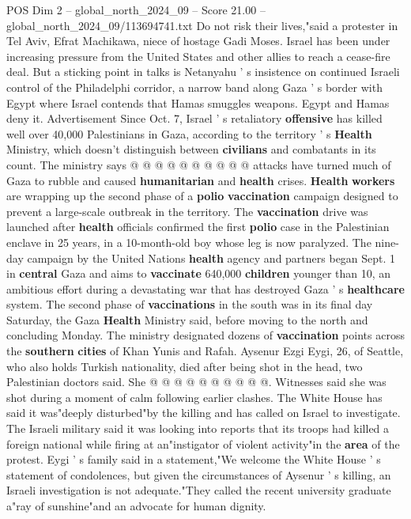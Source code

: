 \begin{textsample}{POS Dim 2 – global\_north\_2024\_09 – Score 21.00 – global\_north\_2024\_09/113694741.txt}
Do not risk their lives,"said a protester in Tel Aviv, Efrat Machikawa, niece of hostage Gadi Moses.
Israel has been under increasing pressure from the United States and other allies to reach a cease-fire deal.
But a sticking point in talks is Netanyahu ' s insistence on continued Israeli control of the Philadelphi corridor, a narrow band along Gaza ' s border with Egypt where Israel contends that Hamas smuggles weapons.
Egypt and Hamas deny it.
Advertisement Since Oct. 7, Israel ' s retaliatory \textbf{offensive} has killed well over 40,000 Palestinians in Gaza, according to the territory ' s \textbf{Health} Ministry, which doesn't distinguish between \textbf{civilians} and combatants in its count.
The ministry says @ @ @ @ @ @ @ @ @ @ attacks have turned much of Gaza to rubble and caused \textbf{humanitarian} and \textbf{health} crises. \textbf{Health} \textbf{workers} are wrapping up the second phase of a \textbf{polio} \textbf{vaccination} campaign designed to prevent a large-scale outbreak in the territory.
The \textbf{vaccination} drive was launched after \textbf{health} officials confirmed the first \textbf{polio} case in the Palestinian enclave in 25 years, in a 10-month-old boy whose leg is now paralyzed.
The nine-day campaign by the United Nations \textbf{health} agency and partners began Sept. 1 in \textbf{central} Gaza and aims to \textbf{vaccinate} 640,000 \textbf{children} younger than 10, an ambitious effort during a devastating war that has destroyed Gaza ' s \textbf{healthcare} system.
The second phase of \textbf{vaccinations} in the south was in its final day Saturday, the Gaza \textbf{Health} Ministry said, before moving to the north and concluding Monday.
The ministry designated dozens of \textbf{vaccination} points across the \textbf{southern} \textbf{cities} of Khan Yunis and Rafah.
Aysenur Ezgi Eygi, 26, of Seattle, who also holds Turkish nationality, died after being shot in the head, two Palestinian doctors said.
She @ @ @ @ @ @ @ @ @ @.
Witnesses said she was shot during a moment of calm following earlier clashes.
The White House has said it was"deeply disturbed"by the killing and has called on Israel to investigate.
The Israeli military said it was looking into reports that its troops had killed a foreign national while firing at an"instigator of violent activity"in the \textbf{area} of the protest.
Eygi ' s family said in a statement,"We welcome the White House ' s statement of condolences, but given the circumstances of Aysenur ' s killing, an Israeli investigation is not adequate."They called the recent university graduate a"ray of sunshine"and an advocate for human dignity.

\end{textsample}
